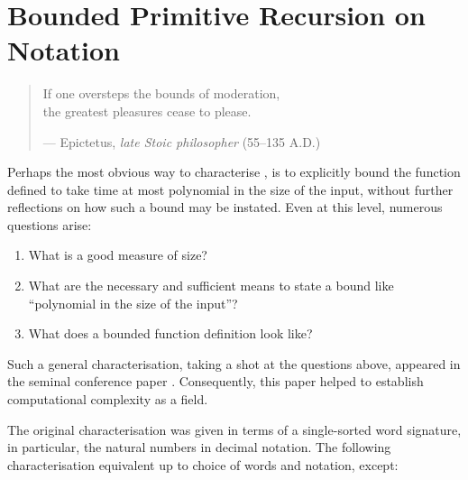 \chapter{Bounded Primitive Recursion on Notation}

\begin{quotation}

\footnotesize\sffamily\itshape

\begin{flushright}

If one oversteps the bounds of moderation, \\
the greatest pleasures cease to please.

\smallbreak

\upshape

--- Epictetus, \emph{late Stoic philosopher} (55--135 A.D.)

\end{flushright}

\end{quotation}

Perhaps the most obvious way to characterise \FPTIME{}, is to explicitly bound
the function defined to take time at most polynomial in the size of the input,
without further reflections on how such a bound may be instated. Even at this
level, numerous questions arise:

\begin{enumerate}[label=(\arabic*)]

\item What is a good measure of size?

\item What are the necessary and sufficient means to state a bound like
``polynomial in the size of the input''?

\item What does a bounded function definition look like?

\end{enumerate}  

Such a general characterisation, taking a shot at the questions above, appeared
in the seminal conference paper \cite{cobham-1965}. Consequently, this paper
helped to establish computational complexity as a field\cite{clote-1999}.

The original characterisation was given in terms of a single-sorted word
signature, in particular, the natural numbers in decimal notation. The
following characterisation equivalent up to choice of words and notation,
except:

